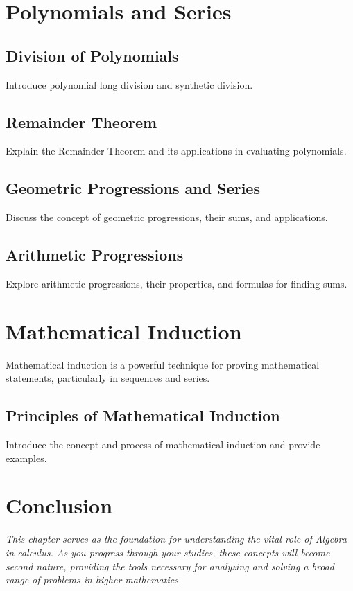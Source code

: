 \documentclass[a4paper,12pt]{book}
\newcounter{problem}
\begin{document}
\section{Polynomials and Series}
\label{sec:polynomials_and_series}


\subsection{Division of Polynomials}
\label{subsec:division_of_polynomials}
Introduce polynomial long division and synthetic division.


\subsection{Remainder Theorem}
\label{subsec:remainder_theorem}
Explain the Remainder Theorem and its applications in evaluating polynomials.


\subsection{Geometric Progressions and Series}
\label{subsec:geometric_progressions_series}
Discuss the concept of geometric progressions, their sums, and applications.


\subsection{Arithmetic Progressions}
\label{subsec:arithmetic_progressions}
Explore arithmetic progressions, their properties, and formulas for finding sums.


\section{Mathematical Induction}
\label{sec:mathematical_induction}
Mathematical induction is a powerful technique for proving mathematical statements, particularly in sequences and series.


\subsection{Principles of Mathematical Induction}
\label{subsec:principles_mathematical_induction}
Introduce the concept and process of mathematical induction and provide examples.


\section*{Conclusion}
\label{sec:alg_conclusion}
\textit{This chapter serves as the foundation for understanding the vital role of Algebra in calculus. As you progress through your studies, these concepts will become second nature, providing the tools necessary for analyzing and solving a broad range of problems in higher mathematics.}
\end{document}
